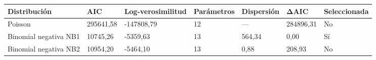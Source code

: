 \begin{tabular}{lllllll}
\toprule
Distribución & AIC & Log-verosimilitud & Parámetros & Dispersión & ΔAIC & Seleccionada \\
\midrule
Poisson & 295641,58 & -147808,79 & 12 & — & 284896,31 & No \\
Binomial negativa NB1 & 10745,26 & -5359,63 & 13 & 564,34 & 0,00 & Sí \\
Binomial negativa NB2 & 10954,20 & -5464,10 & 13 & 0,88 & 208,93 & No \\
\bottomrule
\end{tabular}
